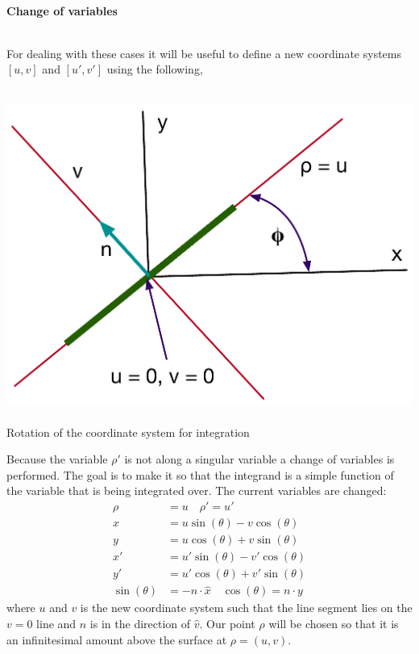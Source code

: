 \documentclass{article}
\newcommand{\0}{\varnothing}
\begin{document}
{\ \\ \centering \bf Change of variables\ \\ \ \\}

For dealing with these cases it will be useful to define a new coordinate systems $[u,v]$ and $[u',v']$ using the following,\\ \

\begin{minipage}{0.3\textwidth}
\begin{center}
\includegraphics[width=1\columnwidth]{figures/Seg}\ \\
Rotation of the coordinate system for integration
\end{center}
\end{minipage}
\begin{minipage}{0.7\textwidth}
Because the variable $\rho'$ is not along a singular variable a change of variables is performed. The goal is to make it so that the integrand is a simple function of the variable that is being integrated over. The current variables are changed:
\begin{align*}
    \rho &= u \quad  \rho' = u'\\
    x &= u\sin(\theta) - v\cos(\theta)\\
    y &= u\cos(\theta) + v\sin(\theta)\\
    x' &= u'\sin(\theta) - v'\cos(\theta)\\
    y' &= u'\cos(\theta) + v'\sin(\theta)\\
    \sin(\theta) &= - n \cdot \hat x \quad \cos(\theta) = n \cdot y
\end{align*}
\noindent where $u$ and $v$ is the new coordinate system such that the line segment lies on the $v = 0$ line and $\hat{n}$ is in the direction of $\hat{v}$. Our point $\rho$ will be chosen so that it is an infinitesimal amount above the surface at $\rho = (u,v)$. 
\end{minipage}
\end{document}

